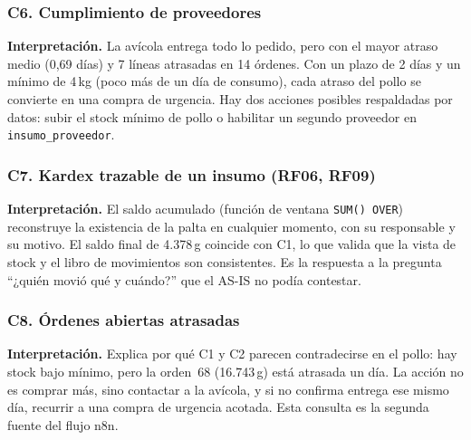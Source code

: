 \documentclass[11pt,letterpaper]{article}
\newcommand{\tablasize}{\footnotesize}
\begin{document}
\subsubsection*{C6. Cumplimiento de proveedores}
\begin{table}[H]\centering\tablasize\setlength{\tabcolsep}{4pt}\end{table}
\noindent\textbf{Interpretación.} La avícola entrega todo lo pedido, pero con el mayor atraso medio (0,69 días) y 7 líneas atrasadas en 14 órdenes. Con un plazo de 2 días y un mínimo de 4\,kg (poco más de un día de consumo), cada atraso del pollo se convierte en una compra de urgencia. Hay dos acciones posibles respaldadas por datos: subir el stock mínimo de pollo o habilitar un segundo proveedor en \texttt{insumo\_proveedor}.

\subsubsection*{C7. Kardex trazable de un insumo (RF06, RF09)}
\begin{table}[H]\centering\tablasize\setlength{\tabcolsep}{4pt}\end{table}
\noindent\textbf{Interpretación.} El saldo acumulado (función de ventana \texttt{SUM() OVER}) reconstruye la existencia de la palta en cualquier momento, con su responsable y su motivo. El saldo final de 4.378\,g coincide con C1, lo que valida que la vista de stock y el libro de movimientos son consistentes. Es la respuesta a la pregunta ``¿quién movió qué y cuándo?'' que el AS-IS no podía contestar.

\subsubsection*{C8. Órdenes abiertas atrasadas}
\begin{table}[H]\centering\tablasize\setlength{\tabcolsep}{3pt}\end{table}
\noindent\textbf{Interpretación.} Explica por qué C1 y C2 parecen contradecirse en el pollo: hay stock bajo mínimo, pero la orden~68 (16.743\,g) está atrasada un día. La acción no es comprar más, sino contactar a la avícola, y si no confirma entrega ese mismo día, recurrir a una compra de urgencia acotada. Esta consulta es la segunda fuente del flujo n8n.

\newpage
\end{document}
